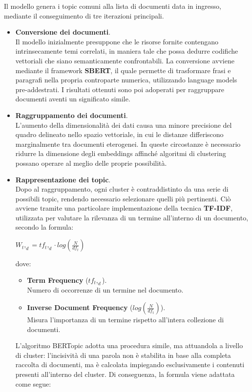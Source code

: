 Il modello genera i topic comuni alla lista di documenti data in ingresso, mediante il conseguimento di tre iterazioni principali.
\begin{itemize}
    \renewcommand{\labelitemi}{-}
    \item \textbf{Conversione dei documenti}. \\
    Il modello inizialmente presuppone che le risorse fornite contengano intrinsecamente temi correlati, in maniera tale che possa dedurre codifiche vettoriali che siano semanticamente confrontabili. La conversione avviene mediante il framework \textbf{SBERT}, il quale permette di trasformare frasi e paragrafi nella propria controparte numerica, utilizzando language models pre-addestrati. I risultati ottenuti sono poi adoperati per raggruppare documenti aventi un significato simile.
    \item \textbf{Raggruppamento dei documenti}. \\
    L'aumento della dimensionalità dei dati causa una minore precisione del quadro delineato nello spazio vettoriale, in cui le distanze differiscono marginalmente tra documenti eterogenei. In queste circostanze è necessario ridurre la dimensione degli embeddings affinché algoritmi di clustering possano operare al meglio delle proprie possibilità.
    \item \textbf{Rappresentazione dei topic}. \\
    Dopo al raggruppamento, ogni cluster è contraddistinto da una serie di possibili topic, rendendo necessario selezionare quelli più pertinenti. Ciò avviene tramite una particolare implementazione della tecnica \textbf{TF-IDF}, utilizzata per valutare la rilevanza di un termine all'interno di un documento, secondo la formula:
    \begin{center}
        $W_t,_d = tf_t,_d \cdot log(\frac{N}{df_t})$
    \end{center}
    dove:
    \begin{itemize}
        \renewcommand{\labelitemi}{-}
        \item \textbf{Term Frequency} ($tf_t,_d$). \\
        Numero di occorrenze di un termine nel documento.
        \item \textbf{Inverse Document Frequency} ($log(\frac{N}{df_t})$). \\
        Misura l'importanza di un termine rispetto all'intera collezione di documenti.
    \end{itemize}
    L'algoritmo BERTopic adotta una procedura simile, ma attuandola a livello di cluster: l'incisività di una parola non è stabilita in base alla completa raccolta di documenti, ma è calcolata impiegando esclusivamente i contenuti presenti all'interno del cluster. Di conseguenza, la formula viene adattata come segue:

\end{itemize}

